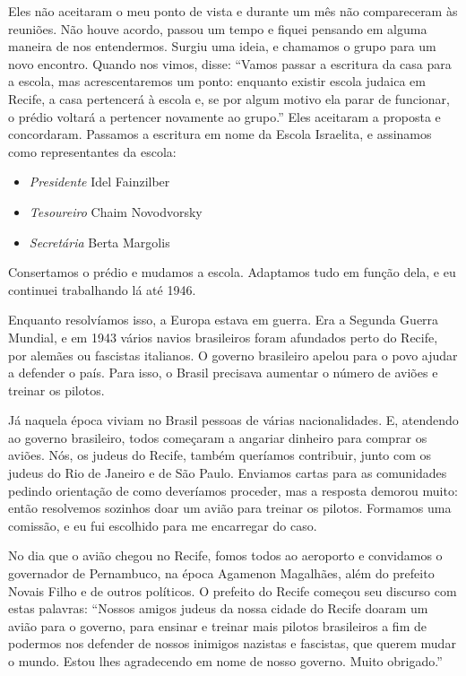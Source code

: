 Eles não aceitaram o meu ponto de vista e durante um mês não
compareceram às reuniões. Não houve acordo, passou
um tempo e fiquei pensando em alguma maneira de nos entendermos.
Surgiu uma ideia, e chamamos o grupo para um novo encontro. Quando nos
vimos, disse: ``Vamos passar a escritura da casa
para a escola, mas acrescentaremos um ponto: enquanto existir escola
judaica em Recife, a casa pertencerá à escola e, se por algum motivo
ela parar de funcionar, o prédio voltará a pertencer novamente ao
grupo.'' Eles aceitaram a proposta e concordaram. Passamos a escritura
em nome da Escola Israelita, e assinamos como representantes da escola:

\begin{itemize}
\item \textit{Presidente} Idel Fainzilber
\item \textit{Tesoureiro} Chaim Novodvorsky
\item \textit{Secretária} Berta Margolis
\end{itemize}

Consertamos o prédio e mudamos a escola. Adaptamos tudo em função dela,
e eu continuei trabalhando lá até 1946.

Enquanto resolvíamos isso, a Europa estava em guerra. Era a Segunda Guerra Mundial, 
e em 1943 vários navios brasileiros foram
afundados perto do Recife, por alemães ou fascistas italianos. O governo
brasileiro apelou para o povo ajudar a defender o país. Para isso,
o Brasil precisava aumentar o número de aviões e treinar os pilotos.

Já naquela época viviam no Brasil pessoas de várias nacionalidades. E,
atendendo ao governo brasileiro, todos começaram a angariar dinheiro para
comprar os aviões. Nós, os judeus do Recife, também queríamos
contribuir, junto com os judeus do Rio de Janeiro e de São Paulo.
Enviamos cartas para as comunidades pedindo orientação de como
deveríamos proceder, mas a resposta demorou muito: então resolvemos
sozinhos doar um avião para treinar os pilotos. Formamos uma comissão, e
eu fui escolhido para me encarregar do caso.

No dia que o avião chegou no Recife, fomos todos ao aeroporto e
convidamos o governador de Pernambuco, na época Agamenon Magalhães, além do
prefeito Novais Filho e de outros políticos. O prefeito do
Recife começou seu discurso com estas palavras: ``Nossos amigos judeus
da nossa cidade do Recife doaram um avião para o governo, para
ensinar e treinar mais pilotos brasileiros a fim de podermos nos defender
de nossos inimigos nazistas e fascistas, que querem mudar o
mundo. Estou lhes agradecendo em nome de nosso governo. Muito obrigado.''

